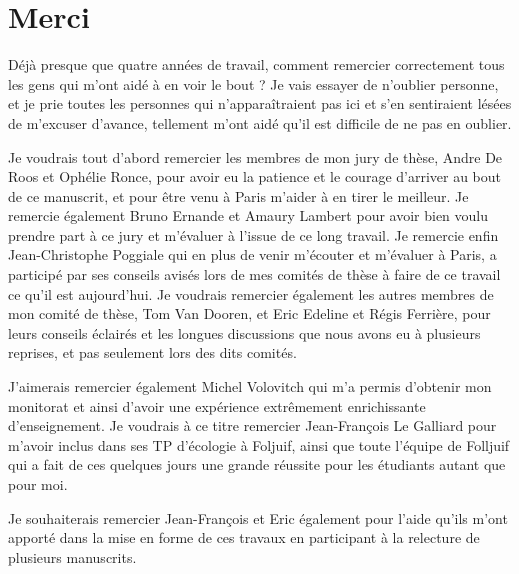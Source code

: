 \chapter*{Merci}

Déjà presque que quatre années de travail, comment remercier correctement tous
les gens qui m’ont aidé à en voir le bout ? Je vais essayer de n’oublier
personne, et je prie toutes les personnes qui n’apparaîtraient pas ici et s’en
sentiraient lésées de m’excuser d’avance, tellement m’ont aidé qu’il est
difficile de ne pas en oublier.

Je voudrais tout d’abord remercier les membres de mon jury de thèse, Andre De
Roos et Ophélie Ronce, pour avoir eu la patience et le courage d’arriver au bout
de ce manuscrit, et pour être venu à Paris m’aider à en tirer le meilleur. Je
remercie également Bruno Ernande et Amaury Lambert pour avoir bien voulu prendre
part à ce jury et m’évaluer à l’issue de ce long travail. Je remercie enfin
Jean-Christophe Poggiale qui en plus de venir m’écouter et m’évaluer à Paris, a
participé par ses conseils avisés lors de mes comités de thèse à faire de ce
travail ce qu’il est aujourd’hui. Je voudrais remercier également les autres
membres de mon comité de thèse, Tom Van Dooren, et Eric Edeline et Régis
Ferrière, pour leurs conseils éclairés et les longues discussions que nous avons
eu à plusieurs reprises, et pas seulement lors des dits comités.

J’aimerais remercier également Michel Volovitch qui m’a permis d’obtenir mon
monitorat et ainsi d’avoir une expérience extrêmement enrichissante
d’enseignement. Je voudrais à ce titre remercier Jean-François Le Galliard pour
m’avoir inclus dans ses TP d’écologie à Foljuif, ainsi que toute l’équipe de
Folljuif qui a fait de ces quelques jours une grande réussite pour les étudiants
autant que pour moi.

Je souhaiterais remercier Jean-François et Eric également pour l’aide qu’ils
m’ont apporté dans la mise en forme de ces travaux en participant à la relecture
de plusieurs manuscrits.

